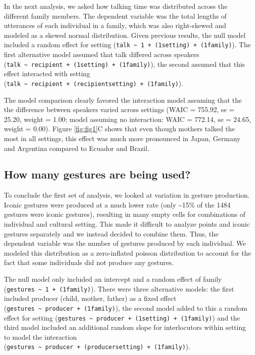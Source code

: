 \documentclass[
  man,floatsintext]{apa6}
\begin{document}
In the next analysis, we asked how talking time was distributed across the different family members. The dependent variable was the total lengths of utterances of each individual in a family, which was also right-skewed and modeled as a skewed normal distribution. Given previous results, the null model included a random effect for setting (\texttt{talk\ \textasciitilde{}\ 1\ +\ (1\textbar{}setting)\ +\ (1\textbar{}family)}). The first alternative model assumed that talk differed across speakers (\texttt{talk\ \textasciitilde{}\ recipient\ +\ (1\textbar{}setting)\ +\ (1\textbar{}family)}), the second assumed that this effect interacted with setting (\texttt{talk\ \textasciitilde{}\ recipient\ +\ (recipient\textbar{}setting)\ +\ (1\textbar{}family)}).

The model comparison clearly favored the interaction model assuming that the the difference between speakers varied across settings (WAIC = 755.92, se = 25.20, weight = 1.00; model assuming no interaction: WAIC = 772.14, se = 24.65, weight = 0.00). Figure \ref{fig:fig1}C shows that even though mothers talked the most in all settings, this effect was much more pronounced in Japan, Germany and Argentina compared to Ecuador and Brazil.

\hypertarget{how-many-gestures-are-being-used}{%
\subsection{How many gestures are being used?}\label{how-many-gestures-are-being-used}}

To conclude the first set of analysis, we looked at variation in gesture production. Iconic gestures were produced at a much lower rate (only \textasciitilde15\% of the 1484 gestures were iconic gestures), resulting in many empty cells for combinations of individual and cultural setting. This made it difficult to analyze points and iconic gestures separately and we instead decided to combine them. Thus, the dependent variable was the number of gestures produced by each individual. We modeled this distribution as a zero-inflated poisson distribution to account for the fact that some individuals did not produce any gestures.

The null model only included an intercept and a random effect of family (\texttt{gestures\ \textasciitilde{}\ 1\ +\ (1\textbar{}family)}). There were three alternative models: the first included producer (child, mother, father) as a fixed effect (\texttt{gestures\ \textasciitilde{}\ producer\ +\ (1\textbar{}family)}), the second model added to this a random effect for setting (\texttt{gestures\ \textasciitilde{}\ producer\ +\ (1\textbar{}setting)\ +\ (1\textbar{}family)}) and the third model included an additional random slope for interlocutors within setting to model the interaction (\texttt{gestures\ \textasciitilde{}\ producer\ +\ (producer\textbar{}setting)\ +\ (1\textbar{}family)}).
\end{document}
